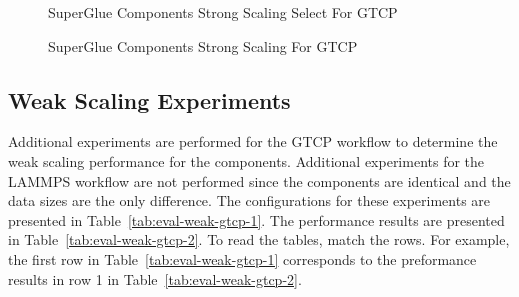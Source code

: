 \documentclass[conference]{IEEEtran}
\begin{document}
\begin{figure}[t!]
\center
{}
\caption{SuperGlue Components Strong Scaling Select For GTCP}
\label{fig:gtcp-strong-select}
\end{figure}

\begin{figure}[t!]
\center
{}
\caption{SuperGlue Components Strong Scaling For GTCP}
\label{fig:gtcp-strong}
\end{figure}

\subsection{Weak Scaling Experiments}

Additional experiments are performed for the GTCP workflow to determine the
weak scaling performance for the components. Additional experiments for the
LAMMPS workflow are not performed since the components are identical and the
data sizes are the only difference. The configurations for these experiments
are presented in Table~\ref{tab:eval-weak-gtcp-1}. The performance results are
presented in Table~\ref{tab:eval-weak-gtcp-2}. To read the tables, match the
rows. For example, the first row in Table~\ref{tab:eval-weak-gtcp-1} corresponds
to the preformance results in row 1 in Table~\ref{tab:eval-weak-gtcp-2}.
\end{document}
